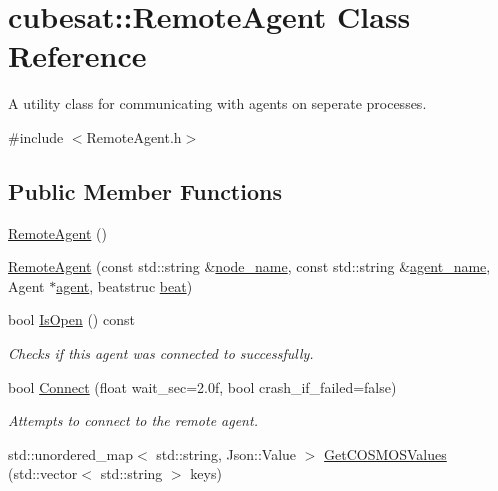\hypertarget{classcubesat_1_1RemoteAgent}{}\section{cubesat\+:\+:Remote\+Agent Class Reference}
\label{classcubesat_1_1RemoteAgent}


A utility class for communicating with agents on seperate processes.  




{\ttfamily \#include $<$Remote\+Agent.\+h$>$}

\subsection*{Public Member Functions}
\begin{DoxyCompactItemize}
\item 
\hyperlink{classcubesat_1_1RemoteAgent_a011f3eddd537166c854dc976f6e04f9b}{Remote\+Agent} ()
\item 
\hyperlink{classcubesat_1_1RemoteAgent_a415c6e6434cbc15c3e0b889c02efbe0a}{Remote\+Agent} (const std\+::string \&\hyperlink{classcubesat_1_1RemoteAgent_ad53ce2f7c8bbe8e8582f82740d5c38fe}{node\+\_\+name}, const std\+::string \&\hyperlink{classcubesat_1_1RemoteAgent_a11c308db5679e300962e8a79b875dba5}{agent\+\_\+name}, Agent $\ast$\hyperlink{classcubesat_1_1RemoteAgent_ab6ebf279927e308af1ecaf81782af2a3}{agent}, beatstruc \hyperlink{classcubesat_1_1RemoteAgent_a56c2e7d52e3ebe7dfe69c4a779f1a375}{beat})
\item 
bool \hyperlink{classcubesat_1_1RemoteAgent_a149ba4f966974d78c265a18921057a6f}{Is\+Open} () const
\begin{DoxyCompactList}\small\item\em Checks if this agent was connected to successfully. \end{DoxyCompactList}\item 
bool \hyperlink{classcubesat_1_1RemoteAgent_a144dbf2aaccbe8cb53f811db1b62cea4}{Connect} (float wait\+\_\+sec=2.\+0f, bool crash\+\_\+if\+\_\+failed=false)
\begin{DoxyCompactList}\small\item\em Attempts to connect to the remote agent. \end{DoxyCompactList}\item 
std\+::unordered\+\_\+map$<$ std\+::string, Json\+::\+Value $>$ \hyperlink{classcubesat_1_1RemoteAgent_afaaaec695eae602bc2a84d6ad88ed7f6}{Get\+C\+O\+S\+M\+O\+S\+Values} (std\+::vector$<$ std\+::string $>$ keys)

\end{DoxyCompactItemize}
